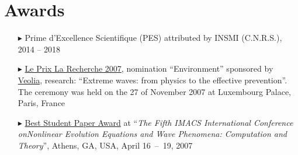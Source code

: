 \section{Awards}
\begin{itemize}
    \item[$\blacktriangleright$] Prime d'Excellence Scientifique (PES) attributed by INSMI (C.N.R.S.), 2014 -- 2018
    \item[$\blacktriangleright$] \href{https://www.actu-environnement.com/ae/news/laureats_prix_la_recherche_2007_mention_environnement_veolia_environnement_3807.php4}{Le Prix La Recherche 2007}, nomination ``Environment'' sponsored by \href{http://www.veolia.fr/}{Veolia}, research: ``Extreme waves: from physics to the effective prevention''. The ceremony was held on the 27 of November 2007 at Luxembourg Palace, Paris, France
    \item[$\blacktriangleright$] \href{https://cobweb.cs.uga.edu/~thiab/waves2007.html}{Best Student Paper Award} at ``\textit{The Fifth IMACS International Conference on\newline Nonlinear Evolution Equations and Wave Phenomena: Computation and Theory}'', Athens, GA, USA, April 16~--~19, 2007
\end{itemize}

    \separator
